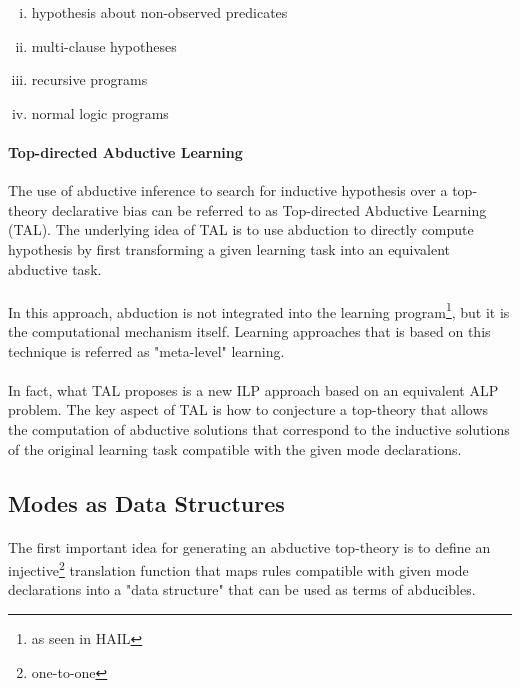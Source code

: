 \documentclass{article}
\theoremstyle{plain}
\theoremstyle{definition}
\begin{document}
\begin{multicols}{2}
\begin{enumerate}[i)]
\item hypothesis about non-observed predicates
\item multi-clause hypotheses
\item recursive programs
\item normal logic programs
\end{enumerate}

\paragraph{Top-directed Abductive Learning} The use of abductive inference to search for inductive hypothesis over a top-theory declarative bias can be referred to as Top-directed Abductive Learning (TAL). The underlying idea of TAL is to use abduction to directly compute hypothesis by first transforming a given learning task into an equivalent abductive task. 

\paragraph{} In this approach, abduction is not integrated into the learning program\footnote{as seen in HAIL}, but it is the computational mechanism itself. Learning approaches that is based on this technique is referred as "meta-level" learning.

\paragraph{} In fact, what TAL proposes is a new ILP approach based on an equivalent ALP problem. The key aspect of TAL is how to conjecture a top-theory that allows the computation of abductive solutions that correspond to the inductive solutions of the original learning task compatible with the given mode declarations.

\subsection{Modes as Data Structures}

\paragraph{} The first important idea for generating an abductive top-theory is to define an injective\footnote{one-to-one} translation function that maps rules compatible with given mode declarations into a "data structure" that can be used as terms of abducibles.


\end{multicols}
\end{document}
